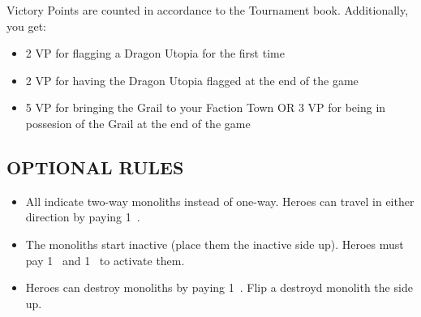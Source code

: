 \begin{multicols}{2}
Victory Points are counted in accordance to the Tournament book. Additionally, you get:
\begin{itemize}
  \item 2 VP for flagging a Dragon Utopia for the first time
  \item 2 VP for having the Dragon Utopia flagged at the end of the game
  \item 5 VP for bringing the Grail to your Faction Town OR 3 VP for being in possesion of the Grail at the end of the game
\end{itemize}

\subsection*{\MakeUppercase{Optional Rules}}
\begin{itemize}
  \item All  indicate two-way monoliths instead of one-way.
    Heroes can travel in either direction by paying 1~.
  \item The monoliths start inactive (place them the inactive  side up).
    Heroes must pay 1~ and 1~ to activate them.
  \item Heroes can destroy monoliths by paying 1~.
    Flip a destroyd monolith the  side up.
\end{itemize}

\end{multicols}

\vspace*{-8em}

